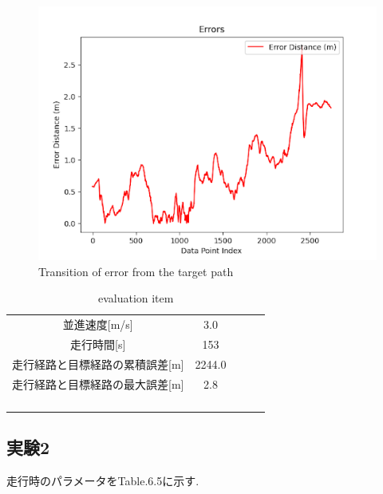 \begin{figure}[H]
     \centering
    \includegraphics[keepaspectratio, scale=0.7]
         {images/3mserror.png}
    \caption{Transition of error from the target path}
    \label{fig:path}
\end{figure}

\begin{table}[H]
     \centering
     \caption{evaluation item}
     \begin{tabular}{cclll}
     \multicolumn{1}{c|}{並進速度{[}m/s{]}}         & 3.0  &  &  &  \\
     \multicolumn{1}{c|}{走行時間{[}s{]}}           & 153   &  &  &  \\
     \multicolumn{1}{c|}{走行経路と目標経路の累積誤差{[}m{]}} & 2244.0 &  &  &  \\
     \multicolumn{1}{c|}{走行経路と目標経路の最大誤差{[}m{]}} & 2.8 &  &  &  \\
                                                &      &  &  &  \\
                                                &      &  &  &  \\
     \multicolumn{1}{l}{}                       &      &  &  &  \\
     \multicolumn{1}{l}{}                       &      &  &  & 
     \end{tabular}
\end{table}

\subsection{実験2}
走行時のパラメータをTable.6.5に示す.

